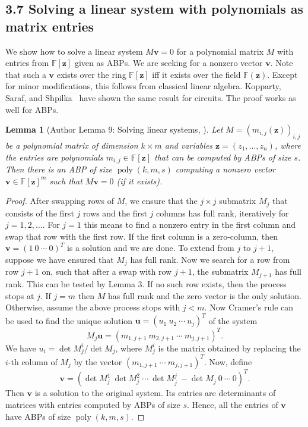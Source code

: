 \documentclass[10pt,a4paper]{article}
\newtheorem{ntlemma}[nttheorem]{Lemma}
\begin{document}
\subsection*{3.7 Solving a linear system with polynomials as matrix entries}
We show how to solve a linear system $M\mathbf v=0$ for a polynomial matrix $M$ with entries from $\mathbb F[\mathbf z]$ given as ABPs. We are seeking for a nonzero vector $\mathbf v$. Note that such a $\mathbf v$ exists over the ring $\mathbb F[\mathbf z]$ iff it exists over the field $\mathbb F(\mathbf z)$.
Except for minor modifications, this follows from classical linear algebra. Kopparty, Saraf, and Shpilka~\cite[Lemma 2.6]{ref12} have shown the same result for circuits. The proof works as well for ABPs.
\begin{ntlemma}[Author Lemma 9: Solving linear systems, {\cite{ref12}}]
Let $M=(m_{i,j}(\mathbf z))_{i,j}$ be a polynomial matrix of dimension $k\times m$ and variables $\mathbf z=(z_1,\ldots,z_n)$, where the entries are polynomials $m_{i,j}\in\mathbb F[\mathbf z]$ that can be computed by ABPs of size $s$.
Then there is an ABP of size $\operatorname{poly}(k,m,s)$ computing a nonzero vector $\mathbf v\in\mathbb F[\mathbf z]^m$ such that $M\mathbf v=0$ (if it exists).
\end{ntlemma}
\begin{proof}
After swapping rows of $M$, we ensure that the $j\times j$ submatrix $M_j$ that consists of the first $j$ rows and the first $j$ columns has full rank, iteratively for $j=1,2,\ldots$.
For $j=1$ this means to find a nonzero entry in the first column and swap that row with the first row. If the first column is a zero-column, then $\mathbf v=(1\ 0\ \cdots\ 0)^T$ is a solution and we are done. To extend from $j$ to $j+1$, suppose we have ensured that $M_j$ has full rank. Now we search for a row from row $j+1$ on, such that after a swap with row $j+1$, the submatrix $M_{j+1}$ has full rank. This can be tested by Lemma 3. If no such row exists, then the process stops at $j$. If $j=m$ then $M$ has full rank and the zero vector is the only solution. Otherwise, assume the above process stops with $j<m$.
Now Cramer's rule can be used to find the unique solution $\mathbf u=(u_1\ u_2\ \cdots\ u_j)^T$ of the system
\[M_j\mathbf u=(m_{1,j+1}\ m_{2,j+1}\ \cdots\ m_{j,j+1})^T.\]
We have $u_i=\det M_j^i/\det M_j$, where $M_j^i$ is the matrix obtained by replacing the $i$-th column of $M_j$ by the vector $(m_{1,j+1}\ \cdots\ m_{j,j+1})^T$. Now, define
\[\mathbf v=(\det M_j^1\ \det M_j^2\ \cdots\ \det M_j^j\ -\det M_j\ 0\ \cdots\ 0)^T.\]
Then $\mathbf v$ is a solution to the original system. Its entries are determinants of matrices with entries computed by ABPs of size $s$. Hence, all the entries of $\mathbf v$ have ABPs of size $\operatorname{poly}(k,m,s)$.
\end{proof}
\end{document}
